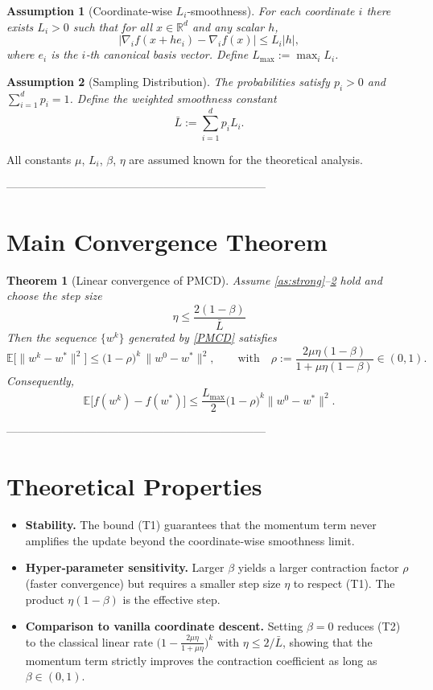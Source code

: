 \documentclass{article}
\newtheorem{theorem}{Theorem}
\newtheorem{assumption}{Assumption}
\newcommand{\E}{\mathbb{E}}
\newcommand{\R}{\mathbb{R}}
\begin{document}
\begin{assumption}[Coordinate‑wise $L_i$‑smoothness]\label{as:smooth}
For each coordinate $i$ there exists $L_i>0$ such that for all $x\in\R^{d}$ and
any scalar $h$,
\[
\bigl|\nabla_i f(x+he_i)-\nabla_i f(x)\bigr|\le L_i|h|,
\]
where $e_i$ is the $i$‑th canonical basis vector.
Define $L_{\max}:=\max_i L_i$.
\end{assumption}

\begin{assumption}[Sampling Distribution]\label{as:prob}
The probabilities satisfy $p_i>0$ and $\sum_{i=1}^{d}p_i=1$.
Define the weighted smoothness constant
\[
\bar L:=\sum_{i=1}^{d}p_i L_i .
\]
\end{assumption}

All constants $\mu$, $L_i$, $\beta$, $\eta$ are assumed known for the
theoretical analysis.

---------------------------------------------------------------------

\section*{Main Convergence Theorem}
\begin{theorem}[Linear convergence of PMCD]\label{thm:linear}
Assume \ref{as:strong}–\ref{as:prob} hold and choose the step size
\[
\boxed{\;\eta\le \frac{2(1-\beta)}{\bar L}\;}
\tag{T1}
\]
Then the sequence $\{w^{k}\}$ generated by \eqref{PMCD} satisfies
\[
\E\!\bigl[\|w^{k}-w^{*}\|^{2}\bigr]\le
\bigl(1-\rho\bigr)^{k}\,\|w^{0}-w^{*}\|^{2},
\qquad\text{with}\quad
\rho:=\frac{2\mu\eta(1-\beta)}{1+\mu\eta(1-\beta)}\in(0,1).
\tag{T2}
\]
Consequently,
\[
\E\!\bigl[f(w^{k})-f(w^{*})\bigr]\le
\frac{L_{\max}}{2}\bigl(1-\rho\bigr)^{k}\|w^{0}-w^{*}\|^{2}.
\]
\end{theorem}

---------------------------------------------------------------------

\section*{Theoretical Properties}
\begin{itemize}
\item \textbf{Stability.} The bound (T1) guarantees that the momentum term never
amplifies the update beyond the coordinate‑wise smoothness limit.
\item \textbf{Hyper‑parameter sensitivity.} Larger $\beta$ yields a larger
contraction factor $\rho$ (faster convergence) but requires a smaller step
size $\eta$ to respect (T1). The product $\eta(1-\beta)$ is the effective step.
\item \textbf{Comparison to vanilla coordinate descent.} Setting $\beta=0$
reduces (T2) to the classical linear rate $\bigl(1-\frac{2\mu\eta}{1+\mu\eta}\bigr)^{k}$
with $\eta\le 2/\bar L$, showing that the momentum term strictly improves the
contraction coefficient as long as $\beta\in(0,1)$.
\end{itemize}
\end{document}
